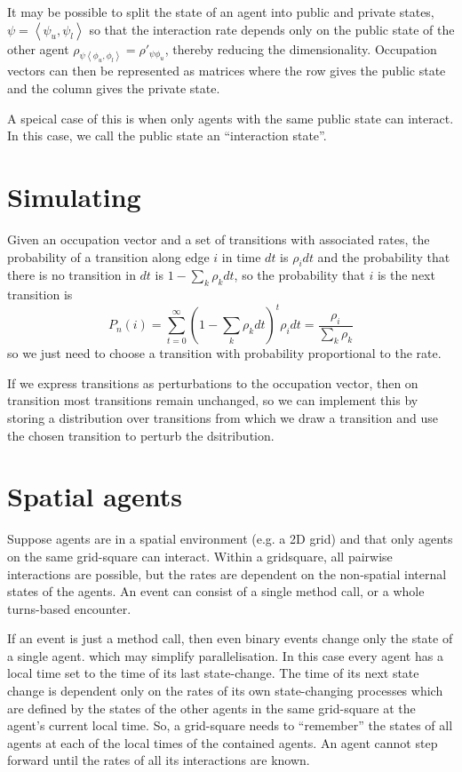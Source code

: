 \documentclass[a4paper]{article}
\begin{document}
It may be possible to split the state of an agent into public and private states, $\psi = \left<\psi_u, \psi_l\right>$ so that the interaction rate depends only on the public state of the other agent $\rho_{\psi\left<\phi_u,\phi_l\right>} = \rho'_{\psi\phi_u}$, thereby reducing the dimensionality. Occupation vectors can then be represented as matrices where the row gives the public state and the column gives the private state.

A speical case of this is when only agents with the same public state can interact. In this case, we call the public state an ``interaction state''.

\section{Simulating}

Given an occupation vector and a set of transitions with associated rates, the probability of a transition along edge $i$ in time $dt$ is $\rho_i dt$ and the probability that there is no transition in $dt$ is $1-\sum_k \rho_k dt$, so the probability that $i$ is the next transition is
\[
P_n(i) = \sum_{t=0}^\infty (1-\sum_k \rho_k dt)^t \rho_i dt = \frac{\rho_i}{\sum_k \rho_k}
\]
so we just need to choose a transition with probability proportional to the rate.

If we express transitions as perturbations to the occupation vector, then on transition most transitions remain unchanged, so we can implement this by storing a distribution over transitions from which we draw a transition and use the chosen transition to perturb the dsitribution.

\section{Spatial agents}

Suppose agents are in a spatial environment (e.g. a 2D grid) and that only agents on the same grid-square can interact. Within a gridsquare, all pairwise interactions are possible, but the rates are dependent on the non-spatial internal states of the agents. An event can consist of a single method call, or a whole turns-based encounter.

If an event is just a method call, then even binary events change only the state of a single agent. which may simplify parallelisation. In this case every agent has a local time set to the time of its last state-change. The time of its next state change is dependent only on the rates of its own state-changing processes which are defined by the states of the other agents in the same grid-square at the agent's current local time. So, a grid-square needs to ``remember'' the states of all agents at each of the local times of the contained agents. An agent cannot step forward until the rates of all its interactions are known.
\end{document}

